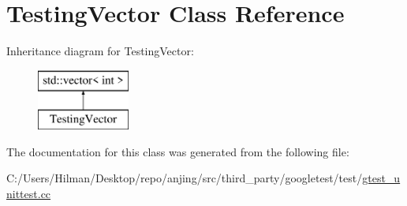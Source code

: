 \hypertarget{class_testing_vector}{}\section{Testing\+Vector Class Reference}
\label{class_testing_vector}
Inheritance diagram for Testing\+Vector\+:\begin{figure}[H]
\begin{center}
\leavevmode
\includegraphics[height=2.000000cm]{class_testing_vector}
\end{center}
\end{figure}


The documentation for this class was generated from the following file\+:\begin{DoxyCompactItemize}
\item 
C\+:/\+Users/\+Hilman/\+Desktop/repo/anjing/src/third\+\_\+party/googletest/test/\hyperlink{gtest__unittest_8cc}{gtest\+\_\+unittest.\+cc}\end{DoxyCompactItemize}
